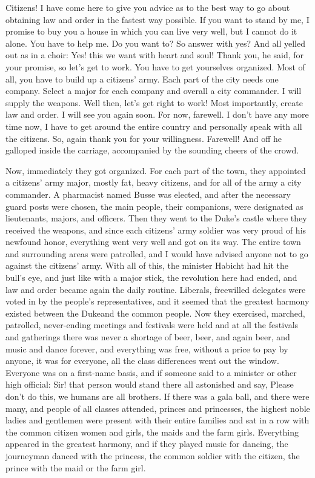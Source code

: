 \documentclass{article}
\begin{document}
Citizens! I have come here to give you advice as to the best way to go about obtaining law and order in the fastest way possible. If you want to stand by me, I promise to buy you a house in which you can live very well, but I cannot do it alone. You have to help me. Do you want to? So answer with yes? And all yelled out as in a choir: Yes! this we want with heart and soul! Thank you, he said, for your promise, so let's get to work. You have to get yourselves organized. Most of all, you have to build up a citizens' army. Each part of the city needs one company. Select a major for each company and overall a city commander. I will supply the weapons. Well then, let's get right to work! Most importantly, create law and order. I will see you again soon. For now, farewell. I don't have any more time now, I have to get around the entire country and personally speak with all the citizens. So, again thank you for your willingness. Farewell! And off he galloped inside the carriage, accompanied by the sounding cheers of the crowd.

Now, immediately they got organized. For each part of the town, they appointed a citizens' army major, mostly fat, heavy citizens, and for all of the army a city commander. A pharmacist named Busse was elected, and after the necessary guard posts were chosen, the main people, their companions, were designated as lieutenants, majors, and officers. Then they went to the Duke's castle where they received the weapons, and since each citizens' army soldier was very proud of his newfound honor, everything went very well and got on its way. The entire town and surrounding areas were patrolled, and I would have advised anyone not to go against the citizens' army. With all of this, the minister Habicht had hit the bull's eye, and just like with a major stick, the revolution here had ended, and law and order became again the daily routine. Liberals, freewilled delegates were voted in by the people's representatives, and it seemed that the greatest harmony existed between the Dukeand the common people. Now they exercised, marched, patrolled, never-ending meetings and festivals were held and at all the festivals and gatherings there was never a shortage of beer, beer, and again beer, and music and dance forever, and everything was free, without a price to pay by anyone, it was for everyone, all the class differences went out the window. Everyone was on a first-name basis, and if someone said to a minister or other high official: Sir! that person would stand there all astonished and say, Please don't do this, we humans are all brothers. If there was a gala ball, and there were many, and people of all classes attended, princes and princesses, the highest noble ladies and gentlemen were present with their entire families and sat in a row with the common citizen women and girls, the maids and the farm girls. Everything appeared in the greatest harmony, and if they played music for dancing, the journeyman danced with the princess, the common soldier with the citizen, the prince with the maid or the farm girl.
\end{document}
